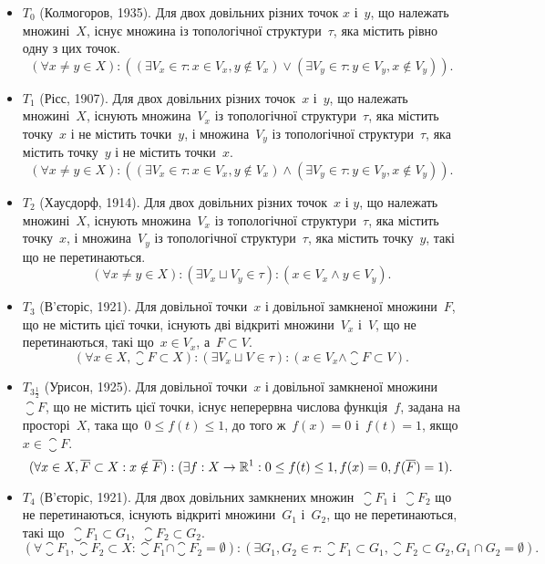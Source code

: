 \begin{itemize}
\item $T_0$ (Колмогоров, 1935). Для двох довільних різних точок
$x$ і~$y$, що належать множині~$X$, існує множина із
топологічної структури~$\tau$, яка містить рівно одну з цих
точок.
\[ (\forall x \ne y \in X): ((\exists V_x \in \tau: x \in V_x, y \notin V_x) \lor (\exists V_y \in \tau: y \in V_y, x \notin V_y)). \]

\item $T_1$ (Рісс, 1907). Для двох довільних різних точок~$x$ і~$y$,
що належать множині~$X$, існують множина~$V_x$ із
топологічної структури~$\tau$, яка містить точку~$x$ і не
містить точки~$y$, і множина~$V_y$ із топологічної
структури~$\tau$, яка містить точку~$y$ і не містить точки~$x$.
\[ (\forall x \ne y \in X): ((\exists V_x \in \tau: x \in V_x, y \notin V_x) \land (\exists V_y \in \tau: y \in V_y, x \notin V_y)). \]

\item $T_2$ (Хаусдорф, 1914). Для двох довільних різних точок~$x$ і
$y$, що належать множині~$X$, існують множина~$V_x$ із
топологічної структури~$\tau$, яка містить точку~$x$, і
множина~$V_y$ із топологічної структури~$\tau$, яка містить
точку~$y$, такі що не перетинаються.
\[ (\forall x \ne y \in X): (\exists V_x \sqcup V_y \in \tau): (x \in V_x \land y \in V_y). \]

\item $T_3$ (В'єторіс, 1921). Для довільної точки~$x$ і довільної
замкненої множини~$F$, що не містить цієї точки, існують
дві відкриті множини~$V_x$ і~$V$, що не перетинаються, такі
що~$x \in V_x$, а~$F \subset V$.
\[ (\forall x \in X, \closure{F} \subset X): (\exists V_x \sqcup V \in \tau): (x \in V_x \land \closure{F} \subset V). \]

\item $T_{3\frac{1}{2}}$ (Урисон, 1925). Для довільної точки~$x$ і довільної
замкненої множини~$\closure{F}$, що не містить цієї точки, існує
неперервна числова функція~$f$, задана на просторі~$X$,
така що~$0 \le f(t) \le 1$, до того ж~$f(x) = 0$ і~$f(t) = 1$, якщо
$x \in \closure{F}$.
\begin{equation*}
(\forall x \in X, \overline{F} \subset X: x \notin \overline{F}):
(\exists f: X \to \mathbb{R}^1: 0 \le f(t) \le 1, f(x) = 0, f(\overline{F}) = 1).
\end{equation*}

\item $T_4$ (В'єторіс, 1921). Для двох довільних замкнених
множин~$\closure{F_1}$ і~$\closure{F_2}$ що не перетинаються, існують відкриті
множини~$G_1$ і~$G_2$, що не перетинаються, такі що~$\closure{F_1} \subset G_1$,~$\closure{F_2} \subset G_2$.
\begin{equation*}
(\forall \closure{F_1}, \closure{F_2} \subset X: \closure{F_1} \cap \closure{F_2} = \emptyset):
(\exists G_1, G_2 \in \tau: \closure{F_1} \subset G_1, \closure{F_2} \subset G_2, G_1 \cap G_2 = \emptyset).
\end{equation*}
\end{itemize}

